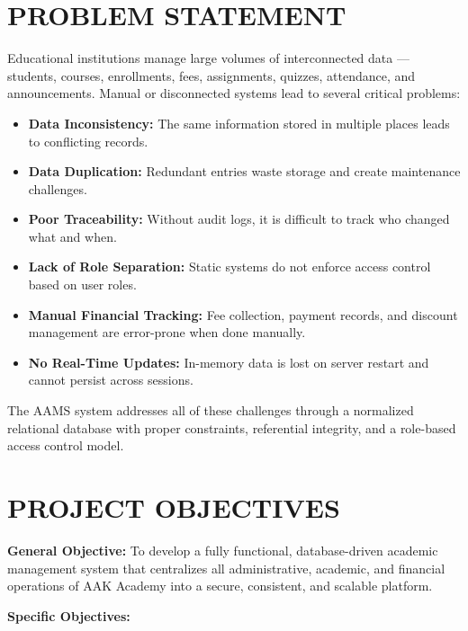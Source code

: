 \documentclass[12pt,a4paper]{report}
\begin{document}
\section{PROBLEM STATEMENT}

Educational institutions manage large volumes of interconnected data — students, courses, enrollments, fees, assignments, quizzes, attendance, and announcements. Manual or disconnected systems lead to several critical problems:

\begin{itemize}[noitemsep]
    \item \textbf{Data Inconsistency:} The same information stored in multiple places leads to conflicting records.
    \item \textbf{Data Duplication:} Redundant entries waste storage and create maintenance challenges.
    \item \textbf{Poor Traceability:} Without audit logs, it is difficult to track who changed what and when.
    \item \textbf{Lack of Role Separation:} Static systems do not enforce access control based on user roles.
    \item \textbf{Manual Financial Tracking:} Fee collection, payment records, and discount management are error-prone when done manually.
    \item \textbf{No Real-Time Updates:} In-memory data is lost on server restart and cannot persist across sessions.
\end{itemize}

The AAMS system addresses all of these challenges through a normalized relational database with proper constraints, referential integrity, and a role-based access control model.

\section{PROJECT OBJECTIVES}

\textbf{General Objective:} To develop a fully functional, database-driven academic management system that centralizes all administrative, academic, and financial operations of AAK Academy into a secure, consistent, and scalable platform.

\textbf{Specific Objectives:}
\end{document}
